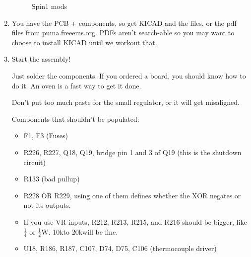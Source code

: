 \documentclass[12pt,a4paper,titlepage]{article}
\begin{document}
\begin{enumerate}
\begin{figure}[htb]
{  \label{fig:usb_hack}
  }
  \caption{Spin1 mods}
\end{figure}

\item You have the PCB + components, so get KICAD and the files, or the pdf files from puma.freeems.org. PDFs aren't search-able so you may want to choose to install KICAD until we workout that.

\item Start the assembly!

Just solder the components. If you ordered a board, you should know how to do it. An oven is a fast way to get it done.

Don't put too much paste for the small regulator, or it will get misaligned.

Components that shouldn't be populated:

\begin{itemize}
\item F1, F3 (Fuses)
\item R226, R227, Q18, Q19, bridge pin 1 and 3 of Q19 (this is the shutdown circuit)
\item R133 (bad pullup)
\item R228 OR R229, using one of them defines whether the XOR negates or not its outputs.
\item If you use VR inputs, R212, R213, R215, and R216 should be bigger, like $\frac{1}{4}$ or $\frac{1}{2}$W. 10k\ohm to 20k\ohm will be fine.
\item U18, R186, R187, C107, D74, D75, C106 (thermocouple driver)
\end{itemize}


\end{enumerate}
\end{document}
